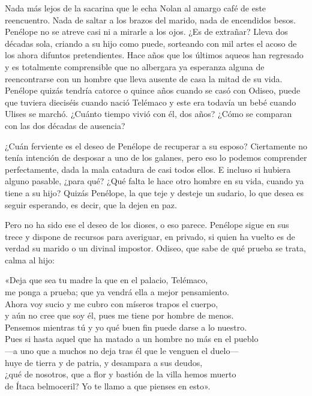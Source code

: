Nada más lejos de la sacarina que le echa Nolan al amargo café de este reencuentro. Nada de saltar a los brazos del marido, nada de encendidos besos. Penélope no se atreve casi ni a mirarle a los ojos. ¿Es de extrañar? Lleva dos décadas sola, criando a su hijo como puede, sorteando con mil artes el acoso de los ahora difuntos pretendientes. Hace años que los últimos aqueos han regresado y es totalmente comprensible que no albergara ya esperanza alguna de reencontrarse con un hombre que lleva ausente de casa la mitad de su vida. Penélope quizás tendría catorce o quince años cuando se casó con Odiseo, puede que tuviera dieciséis cuando nació Telémaco y este era todavía un bebé cuando Ulises se marchó. ¿Cuánto tiempo vivió con él, dos años? ¿Cómo se comparan con las dos décadas de ausencia?

¿Cuán ferviente es el deseo de Penélope de recuperar a su esposo? Ciertamente no tenía intención de desposar a uno de los galanes, pero eso lo podemos comprender perfectamente, dada la mala catadura de casi todos ellos. E incluso si hubiera alguno pasable, ¿para qué? ¿Qué falta le hace otro hombre en su vida, cuando ya tiene a su hijo? Quizás Penélope, la que teje y desteje un sudario, lo que desea es seguir esperando, es decir, que la dejen en paz.

Pero no ha sido ese el deseo de los dioses, o eso parece. Penélope sigue en sus trece y dispone de recursos para averiguar, en privado, si quien ha vuelto es de verdad su marido o un divinal impostor. Odiseo, que sabe de qué prueba se trata, calma al hijo:

\begin{versocita}
«Deja que sea tu madre la que en el palacio, Telémaco,\\
me ponga a prueba; que ya vendrá ella a mejor pensamiento.\\
Ahora voy sucio y me cubro con míseros trapos el cuerpo,\\
y aún no cree que soy él, pues me tiene por hombre de menos.\\
Pensemos mientras tú y yo qué buen fin puede darse a lo nuestro.\\
Pues si hasta aquel que ha matado a un hombre no más en el pueblo\\
---a uno que a muchos no deja tras él que le venguen el duelo---\\
huye de tierra y de patria, y desampara a sus deudos,\\
¿qué de nosotros, que a flor y bastión de la villa hemos muerto\\
de Ítaca belmoceril? Yo te llamo a que pienses en esto».
\end{versocita}


